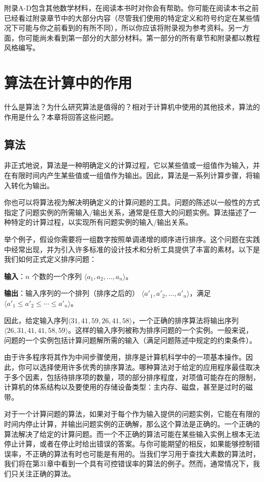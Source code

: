 \documentclass[lang=cn,newtx,10pt,scheme=chinese]{elegantbook}
\begin{document}
附录A-D包含其他数学材料，在阅读本书时对你会有帮助。你可能在阅读本书之前已经看过附录章节中的大部分内容（尽管我们使用的特定定义和符号约定在某些情况下可能与你之前看到的有所不同），所以你应该将附录视为参考资料。另一方面，你可能尚未看到第一部分的大部分材料。第一部分的所有章节和附录都以教程风格编写。

\chapter{算法在计算中的作用}

什么是算法？为什么研究算法是值得的？相对于计算机中使用的其他技术，算法的作用是什么？本章将回答这些问题。

\section{算法}

非正式地说，算法是一种明确定义的计算过程，它以某些值或一组值作为输入，并在有限时间内产生某些值或一组值作为输出。因此，算法是一系列计算步骤，将输入转化为输出。

你也可以将算法视为解决明确定义的计算问题的工具。问题的陈述以一般性的方式指定了问题实例的所需输入/输出关系，通常是任意大的问题实例。算法描述了一种特定的计算过程，以实现所有问题实例的输入/输出关系。

举个例子，假设你需要将一组数字按照单调递增的顺序进行排序。这个问题在实践中经常出现，并为引入许多标准的设计技术和分析工具提供了丰富的素材。以下是我们如何正式定义排序问题：

\textbf{输入}：$n$ 个数的一个序列 $\langle a_1, a_2, ..., a_n\rangle$。

\textbf{输出}：输入序列的一个排列（排序之后的） $\langle{a'_1,a'_2,...,a'_n}\rangle$，满足$\langle{a'_1\le a'_2\le \cdots\le a'_n}\rangle$。

因此，给定输入序列$\langle{31,41,59,26,41,58}\rangle$，一个正确的排序算法将输出序列 $\langle{26,31,41,41,58,59}\rangle$。这样的输入序列被称为排序问题的一个实例。一般来说，问题的一个实例包括计算问题解所需的输入（满足问题陈述中规定的约束条件）。

由于许多程序将其作为中间步骤使用，排序是计算机科学中的一项基本操作。因此，你可以选择使用许多优秀的排序算法。哪种算法对于给定的应用程序最佳取决于多个因素，包括待排序项的数量，项的部分排序程度，对项值可能存在的限制，计算机的体系结构以及要使用的存储设备类型：主内存、磁盘，甚至是过时的磁带。

对于一个计算问题的算法，如果对于每个作为输入提供的问题实例，它能在有限的时间内停止计算，并输出问题实例的正确解，那么这个算法是正确的。一个正确的算法解决了给定的计算问题。而一个不正确的算法可能在某些输入实例上根本无法停止计算，或者在停止时给出错误的答案。与你可能期望的相反，如果能够控制错误率，不正确的算法有时也可能是有用的。当我们学习用于查找大素数的算法时，我们将在第31章中看到一个具有可控错误率的算法的例子。然而，通常情况下，我们只关注正确的算法。
\end{document}
